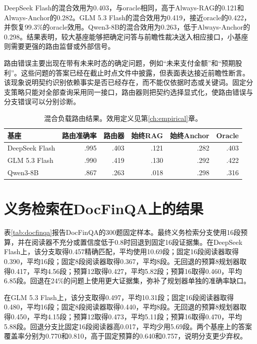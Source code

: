 DeepSeek Flash的混合效用为0.403，与oracle相同，高于Always-RAG的0.121和Always-Anchor的0.282。GLM 5.3 Flash的混合效用为0.419，接近oracle的0.422，并恢复99.3\%的oracle效用。Qwen3-8B的混合效用为0.263，低于Always-Anchor的0.298。结果表明，较大基座能够把确定问答与前瞻性裁决送入相应接口，小基座则需要更强的路由监督或外部信号。

路由错误主要出现在带有未来时态的确定问题，例如“未来支付金额”和“预期股利”。这些问题的答案已经在截止时点文件中披露，但表面表达接近前瞻性断言。该现象说明契约识别依赖事实是否已经存在，而不能仅依据时态或关键词。固定分支策略只能对全部查询采用同一接口，路由器则把契约选择显式化，使路由错误与分支错误可以分别诊断。

\begin{table}[H]
\centering
{}
\setlength{\tabcolsep}{3pt}
\caption{混合负载路由结果。效用定义见第\ref{ch:empirical}章。}
\label{tab:router}
\begin{tabular}{lrrrrr}
\toprule
基座 & 路由准确率 & 路由器 & 始终RAG & 始终Anchor & Oracle \\
\midrule
DeepSeek Flash & .995 & .403 & .121 & .282 & .403 \\
GLM 5.3 Flash & .990 & .419 & .130 & .292 & .422 \\
Qwen3-8B & .867 & .263 & .018 & .298 & .316 \\
\bottomrule
\end{tabular}
\end{table}

\section{义务检索在DocFinQA上的结果}

表\ref{tab:docfinqa}报告DocFinQA的300题固定样本。最终义务检索分支使用16段预算，并在阅读器不充分或置信度低于0.8时回退到固定16段证据集。在DeepSeek Flash上，该分支取得0.457精确匹配，平均使用10.69段；固定16段阅读器取得0.390，平均16段；固定8段阅读器取得0.367，平均8段。无回退的预算8规划器取得0.417，平均4.56段；预算12取得0.427，平均5.82段；预算16取得0.460，平均6.85段。回退在24\%的问题上使用更大证据集，弥补了规划器单独的准确率缺口。

在GLM 5.3 Flash上，该分支取得0.497，平均10.31段；固定16段阅读器取得0.480，平均16段；固定8段阅读器取得0.440，平均8段。无回退的预算8规划器取得0.450，平均4.15段；预算12取得0.473，平均5.11段；预算16取得0.470，平均5.88段。回退分支比固定16段阅读器高0.017，平均少用5.69段。两个基座上的答案覆盖率分别为0.770和0.810，高于固定预算的0.640和0.757，说明分支更少弃权。

